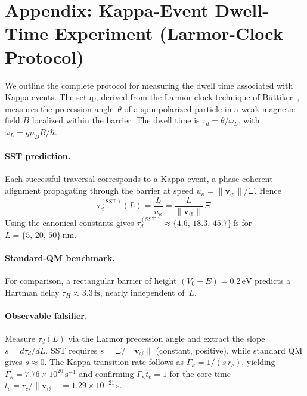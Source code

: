 \documentclass[10pt,reprint,aps,onecolumn,nofootinbib]{revtex4-2}
\begin{document}
\section{Appendix: Kappa-Event Dwell-Time Experiment (Larmor-Clock Protocol)}
\label{app:KappaLarmor}

    We outline the complete protocol for measuring the dwell time associated with Kappa events. The setup, derived from the Larmor-clock technique of Büttiker~\cite{Buttiker1983}, measures the precession angle~$\theta$ of a spin-polarized particle in a weak magnetic field $B$ localized within the barrier. The dwell time is $\tau_d = \theta/\omega_L$, with $\omega_L = g\mu_B B/\hbar$.

    \paragraph{SST prediction.}
    Each successful traversal corresponds to a Kappa event, a phase-coherent alignment propagating through the barrier at speed $u_\kappa = \lVert\mathbf{v}_{\!\boldsymbol{\circlearrowleft}}\rVert/\Xi$. Hence
    \begin{equation}
    \tau^{(\mathrm{SST})}_d(L) = \frac{L}{u_\kappa} = \frac{L}{\lVert\mathbf{v}_{\!\boldsymbol{\circlearrowleft}}\rVert}\,\Xi .
    \end{equation}
    Using the canonical constants gives $\tau_d^{(\mathrm{SST})} \approx \{4.6,\,18.3,\,45.7\}\,\mathrm{fs}$ for $L = \{5,\,20,\,50\}\,\mathrm{nm}$.

    \paragraph{Standard-QM benchmark.}
    For comparison, a rectangular barrier of height $(V_0-E) = 0.2\,\mathrm{eV}$ predicts a Hartman delay $\tau_H \approx 3.3\,\mathrm{fs}$, nearly independent of~$L$.

    \paragraph{Observable falsifier.}
    Measure $\tau_d(L)$ via the Larmor precession angle and extract the slope $s = d\tau_d/dL$. SST requires $s = \Xi/\lVert\mathbf{v}_{\!\boldsymbol{\circlearrowleft}}\rVert$ (constant, positive), while standard QM gives $s \approx 0$. The Kappa transition rate follows as $\Gamma_\kappa = 1/(s\,r_c)$, yielding $\Gamma_\kappa = 7.76\times10^{20}\,\mathrm{s^{-1}}$ and confirming $\Gamma_\kappa t_c = 1$ for the core time $t_c = r_c/\lVert\mathbf{v}_{\!\boldsymbol{\circlearrowleft}}\rVert = 1.29\times10^{-21}\,\mathrm{s}$.
\end{document}
